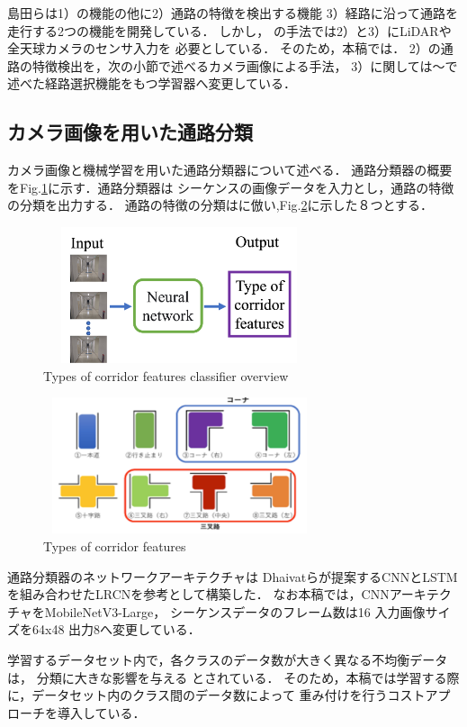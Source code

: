 \documentclass{sice-si}
\begin{document}
\par
島田らは1）の機能の他に2）通路の特徴を検出する機能
3）経路に沿って通路を走行する2つの機能を開発している．
しかし，\cite{shimada2020}\cite{hara2022}
の手法では2）と3）にLiDARや全天球カメラのセンサ入力を
必要としている．
そのため，本稿では．
2）の通路の特徴検出を，次の小節で述べるカメラ画像による手法，
3）に関しては〜で述べた経路選択機能をもつ学習器へ変更している．

\subsection{カメラ画像を用いた通路分類}
カメラ画像と機械学習を用いた通路分類器について述べる．
通路分類器の概要をFig.\ref{fig:lrcn}に示す．通路分類器は
シーケンスの画像データを入力とし，通路の特徴の分類を出力する．
通路の特徴の分類は\cite{shimada2020}に倣い,Fig.\ref{fig:intersection}に示した８つとする．
\begin{figure}[h!]
    \centering
     \includegraphics[height=40mm,width=80mm]{./figs/LRCN_gai.png}
     \caption{Types of corridor features classifier overview}\label{fig:lrcn}
\end{figure}
\begin{figure}[h!]
    \centering
     \includegraphics[height=40mm,width=80mm]{./figs/intersection.png}
     \caption{Types of corridor features}\label{fig:intersection}
\end{figure}
\par
通路分類器のネットワークアーキテクチャは
Dhaivatらが提案するCNNとLSTMを組み合わせたLRCN\cite{lrcn}を参考として構築した．
なお本稿では，CNNアーキテクチャをMobileNetV3-Large\cite{v3}，
シーケンスデータのフレーム数は16 入力画像サイズを64x48 出力8へ変更している．
\par
学習するデータセット内で，各クラスのデータ数が大きく異なる不均衡データは，
分類に大きな影響を与える
\cite{hukin}
とされている．
そのため，本稿では学習する際に，データセット内のクラス間のデータ数によって
重み付けを行うコストアプローチ\cite{cost}を導入している．
\end{document}
